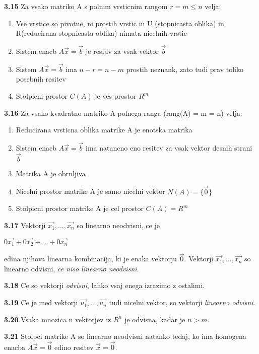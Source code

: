 \documentclass{article}
\begin{document}
\begin{multicols}{3}
\textbf{3.15} Za vsako matriko A s polnim vrsticnim rangom $r = m \leq n$ velja:
\begin{enumerate}
    \item Vse vrstice so pivotne, ni prostih vrstic in U (stopnicasta oblika) in R(reducirana stopnicasta oblika) nimata nicelnih vrstic
    \item Sistem enacb $A\vec{x} = \vec{b}$ je resljiv za vsak vektor $\vec{b}$
    \item Sistem $A\vec{x} = \vec{b}$ ima $n-r = n-m$ prostih neznank, zato tudi prav toliko posebnih resitev
    \item Stolpicni prostor $C(A)$ je ves prostor $R^{m}$
\end{enumerate}

\textbf{3.16} Za vsako kvadratno matriko A polnega ranga (rang(A) = m = n) velja:
\begin{enumerate}
    \item Reducirana vrsticna oblika matrike A je enotska matrika
    \item Sistem enacb $A\vec{x} = \vec{b}$ ima natancno eno resitev za vsak vektor desnih strani $\vec{b}$
    \item Matrika A je obrnljiva
    \item Nicelni prostor matrike A je samo nicelni vektor $N(A) = \{\vec{0}\}$
    \item Stolpicni prostor matrike A je cel prostor $C(A) = R^{m}$
\end{enumerate}

\textbf{3.17} Vektorji $\vec{x_{1}}, \dots,\vec{x_{n}}$ so linearno neodvisni, ce je
\begin{center}
    $ 0\vec{x_{1}} + 0\vec{x_{2}} + \dots + 0\vec{x_{n}}$
\end{center}
edina njihova linearna kombinacija, ki je enaka vektorju $\vec{0}$. Vektorji $\vec{x_{1}}, \dots,\vec{x_{n}}$ so
linearno odvisni, \textit{ce niso linearno neodvisni}.

\textbf{3.18} Ce so vektorji \textit{odvisni}, lahko vsaj enega izrazimo z ostalimi.

\textbf{3.19} Ce je med vektorji  $\vec{u_{1}}, \dots,\vec{u_{n}}$ tudi nicelni vektor, so 
vektorji \textit{linearno odvisni}.

\textbf{3.20} Vsaka mnozica n vektorjev iz $R^{n}$ je odvisna, kadar je $n > m $.

\textbf{3.21} Stolpci matrike A so linearno neodvisni natanko tedaj, ko ima homogena enacba
$A\vec{x} = \vec{0}$ edino resitev $\vec{x} = \vec{0}$.


\end{multicols}
\end{document}
